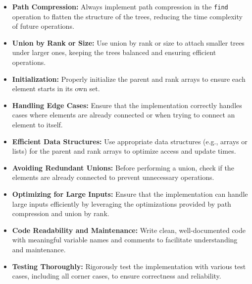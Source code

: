 \begin{itemize}
    \item \textbf{Path Compression:}  
    Always implement path compression in the \texttt{find} operation to flatten the structure of the trees, reducing the time complexity of future operations.
    
    \item \textbf{Union by Rank or Size:}  
    Use union by rank or size to attach smaller trees under larger ones, keeping the trees balanced and ensuring efficient operations.
    
    \item \textbf{Initialization:}  
    Properly initialize the parent and rank arrays to ensure each element starts in its own set.
    
    \item \textbf{Handling Edge Cases:}  
    Ensure that the implementation correctly handles cases where elements are already connected or when trying to connect an element to itself.
    
    \item \textbf{Efficient Data Structures:}  
    Use appropriate data structures (e.g., arrays or lists) for the parent and rank arrays to optimize access and update times.
    
    \item \textbf{Avoiding Redundant Unions:}  
    Before performing a union, check if the elements are already connected to prevent unnecessary operations.
    
    \item \textbf{Optimizing for Large Inputs:}  
    Ensure that the implementation can handle large inputs efficiently by leveraging the optimizations provided by path compression and union by rank.
    
    \item \textbf{Code Readability and Maintenance:}  
    Write clean, well-documented code with meaningful variable names and comments to facilitate understanding and maintenance.
    
    \item \textbf{Testing Thoroughly:}  
    Rigorously test the implementation with various test cases, including all corner cases, to ensure correctness and reliability.
\end{itemize}

